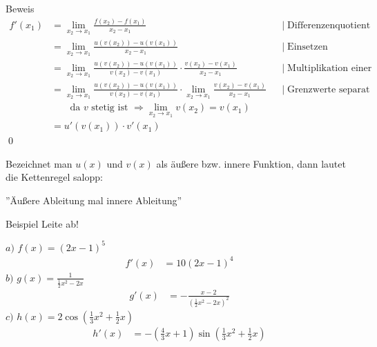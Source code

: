 \documentclass{article}
\begin{document}
\begin{boxx}[Purple]{Beweis}
    \begin{align*}
        f'\left(x_1\right) &= \lim_{x_2 \to x_1} \frac{f\left(x_2\right)-f\left(x_1\right)}{x_2 - x_1} & &|\;\text{Differenzenquotient}\\
        &= \lim_{x_2 \to x_1} \frac{u\left(v\left(x_2\right)\right)- u\left(v\left(x_1\right)\right)}{x_2 - x_1}& &|\;\text{Einsetzen} \\
        &= \lim_{x_2 \to x_1} \frac{u\left(v\left(x_2\right)\right)- u\left(v\left(x_1\right)\right)}{v\left(x_2\right)-v\left(x_1\right)} \cdot \frac{v\left(x_2\right)-v\left(x_1\right)}{x_2 - x_1}& &|\;\text{Multiplikation einer 1} \\
        &= \lim_{x_2 \to x_1} \frac{u\left(v\left(x_2\right)\right)- u\left(v\left(x_1\right)\right)}{v\left(x_2\right)-v\left(x_1\right)} \cdot \lim_{x_2 \to x_1} \frac{v\left(x_2\right)-v\left(x_1\right)}{x_2 - x_1}& &|\;\text{Grenzwerte separat berechnen} \\
        &\;\;\;\;\;\;\;\text{da } v \text{ stetig ist } \Rightarrow  \lim_{x_2 \to x_1} v\left(x_2\right) = v\left(x_1\right) \\
        &= u'\left(v\left(x_1\right)\right) \cdot v'\left(x_1\right)
    \end{align*}
    \qed
\end{boxx}

Bezeichnet man $u(x)$ und $v(x)$ als äußere bzw. innere Funktion, dann lautet die Kettenregel salopp:

''Äußere Ableitung mal innere Ableitung''

\begin{boxx}[DarkBlue]{Beispiel}
    Leite ab!

    $a)$\hspace{3mm} $\displaystyle f(x) = (2x-1)^5$
    \begin{align*}
        f'(x) &= 10(2x-1)^4
    \end{align*}
    $b)$\hspace{3mm} $\displaystyle g(x) = \frac{1}{\frac{1}{2}x^2-2x}$
    \begin{align*}
        g'(x) &= -\frac{x-2}{\left(\frac{1}{2}x^2-2x\right)^2}
    \end{align*}
    $c)$\hspace{3mm} $\displaystyle h(x) = 2\cos\left(\frac{1}{3}x^2+\frac{1}{2}x\right)$
    \begin{align*}
        h'(x) &= -\left(\frac{4}{3}x + 1\right)\sin\left(\frac{1}{3}x^2+\frac{1}{2}x\right)
    \end{align*}
\end{boxx}
\end{document}
